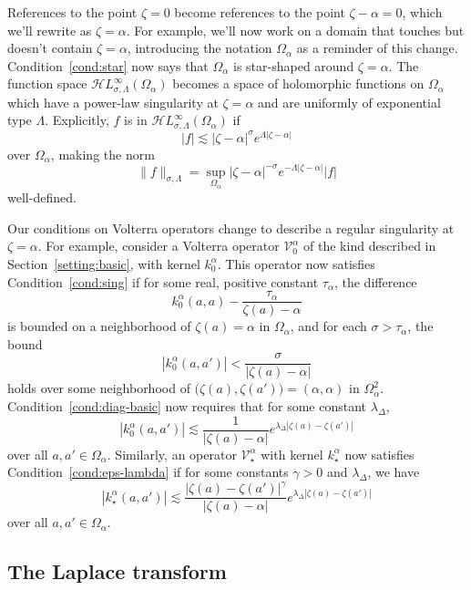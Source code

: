\documentclass{article}
\theoremstyle{definition}
\theoremstyle{plain}
\newcommand{\singexp}[2]{\mathcal{H}L^\infty_{#1, #2}}
\newcommand{\hardpart}{\mathcal{V}_0}
\newcommand{\softpart}{\mathcal{V}_\star}
\newcommand{\hardker}{k_0}
\newcommand{\softker}{k_\star}
\newcommand{\domain}{\Omega}
\begin{document}
References to the point $\zeta=0$ become references to the point $\zeta-\alpha=0$, which we'll rewrite as $\zeta=\alpha$. For example, we'll now work on a domain that touches but doesn't contain $\zeta = \alpha$, introducing the notation $\domain_\alpha$ as a reminder of this change. Condition~\eqref{cond:star} now says that $\domain_\alpha$ is star-shaped around $\zeta = \alpha$. The function space $\singexp{\sigma}{\Lambda}(\domain_\alpha)$ becomes a space of holomorphic functions on $\domain_\alpha$ which have a power-law singularity at $\zeta=\alpha$ and are uniformly of exponential type $\Lambda$. Explicitly, $f$ is in $\singexp{\sigma}{\Lambda}(\domain_\alpha)$ if 
\[ |f| \lesssim |\zeta-\alpha|^\sigma e^{\Lambda |\zeta-\alpha|} \]
over $\domain_\alpha$, making the norm
\[ \|f\|_{\sigma, \Lambda} = \sup_{\domain_\alpha} |\zeta-\alpha|^{-\sigma} e^{-\Lambda |\zeta-\alpha|} |f| \]
well-defined.

Our conditions on Volterra operators change to describe a regular singularity at $\zeta = \alpha$. For example, consider a Volterra operator $\hardpart^\alpha$ of the kind described in Section~\ref{setting:basic}, with kernel $\hardker^\alpha$. This operator now satisfies Condition~\eqref{cond:sing} if for some real, positive constant $\tau_\alpha$, the difference
\[ \hardker^\alpha(a, a) - \frac{\tau_\alpha}{\zeta(a) - \alpha} \]
is bounded on a neighborhood of $\zeta(a) = \alpha$ in $\domain_\alpha$, and for each $\sigma > \tau_\alpha$, the bound
\[ |\hardker^\alpha(a, a')| < \frac{\sigma}{|\zeta(a) - \alpha|} \]
holds over some neighborhood of $\big(\zeta(a), \zeta(a')\big) = (\alpha,\alpha)$ in $\domain_\alpha^2$. Condition~\eqref{cond:diag-basic} now requires that for some constant $\lambda_\Delta$,
\[|\hardker^\alpha(a,a')|\lesssim\frac{1}{|\zeta(a)-\alpha|} e^{\lambda_\Delta|\zeta(a)-\zeta(a')|}\]
over all $a,a'\in\domain_\alpha$. 
Similarly, an operator $\softpart^\alpha$ with kernel $\softker^\alpha$ now satisfies Condition~\eqref{cond:eps-lambda} if for some constants $\gamma > 0$ and $\lambda_\Delta$, we have
\[ |\softker^\alpha(a,a')| \lesssim \frac{|\zeta(a)-\zeta(a')|^\gamma}{|\zeta(a)-\alpha|} e^{\lambda_\Delta |\zeta(a)-\zeta(a')|}\]
over all $a, a' \in \domain_\alpha$.
\subsection{The Laplace transform}
\end{document}
